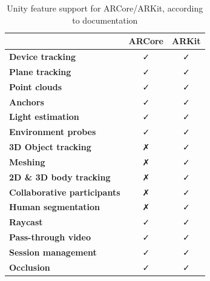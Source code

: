         \begin{table}[th]\small\linespread{1}
            \caption{Unity feature support for ARCore/ARKit, according to documentation}
            \label{3:tab:unity_ar_support}
            \centering
            \begin{tabular}{|l|c|c|}
                \cline{2-3}
                \multicolumn{1}{c|}{} & \textbf{ARCore} & \textbf{ARKit} \\ \hline
                \textbf{Device tracking} & \faCheck & \faCheck \\
                \hline
                \textbf{Plane tracking} & \faCheck & \faCheck \\
                \hline
                \textbf{Point clouds} & \faCheck & \faCheck \\
                \hline
                \textbf{Anchors} & \faCheck & \faCheck \\
                \hline
                \textbf{Light estimation} & \faCheck & \faCheck \\
                \hline
                \textbf{Environment probes} & \faCheck & \faCheck \\
                \hline
                \textbf{3D Object tracking} & \faClose & \faCheck \\
                \hline
                \textbf{Meshing} & \faClose & \faCheck \\
                \hline
                \textbf{2D \& 3D body tracking} & \faClose & \faCheck \\
                \hline
                \textbf{Collaborative participants} & \faClose & \faCheck \\
                \hline
                \textbf{Human segmentation} & \faClose & \faCheck \\
                \hline
                \textbf{Raycast} & \faCheck & \faCheck \\
                \hline
                \textbf{Pass-through video} & \faCheck & \faCheck \\
                \hline
                \textbf{Session management} & \faCheck & \faCheck \\
                \hline
                \textbf{Occlusion} & \faCheck & \faCheck \\
                \hline
            \end{tabular}
        \end{table}
        
